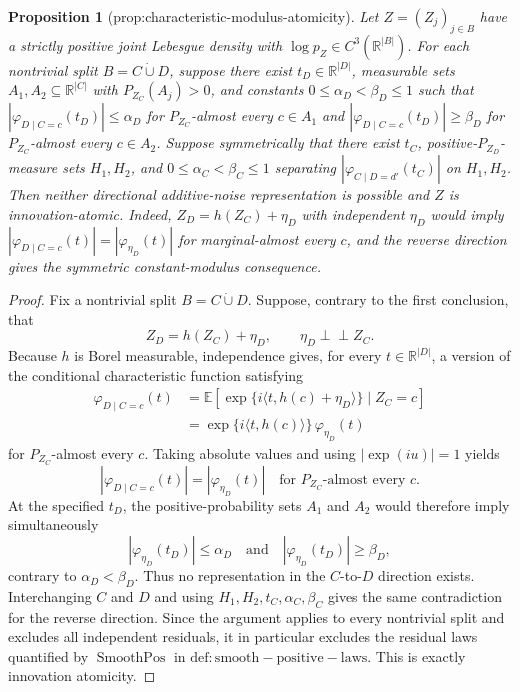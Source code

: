 \documentclass{article}
\newtheorem{proposition}{Proposition}
\begin{document}
\begin{proposition}[prop:characteristic-modulus-atomicity]\label{prop:characteristic-modulus-atomicity}
Let \(Z=(Z_j)_{j\in B}\) have a strictly positive joint Lebesgue density with \(\log p_Z\in C^3(\mathbb R^{|B|})\). For each nontrivial split \(B=C\mathbin{\dot\cup}D\), suppose there exist \(t_D\in\mathbb R^{|D|}\), measurable sets \(A_1,A_2\subseteq\mathbb R^{|C|}\) with \(P_{Z_C}(A_j)>0\), and constants \(0\le\alpha_D<\beta_D\le1\) such that \( |\varphi_{D\mid C=c}(t_D)|\le\alpha_D\) for \(P_{Z_C}\)-almost every \(c\in A_1\) and \( |\varphi_{D\mid C=c}(t_D)|\ge\beta_D\) for \(P_{Z_C}\)-almost every \(c\in A_2\). Suppose symmetrically that there exist \(t_C\), positive-\(P_{Z_D}\)-measure sets \(H_1,H_2\), and \(0\le\alpha_C<\beta_C\le1\) separating \( |\varphi_{C\mid D=d'}(t_C)|\) on \(H_1,H_2\). Then neither directional additive-noise representation is possible and \(Z\) is innovation-atomic. Indeed, \(Z_D=h(Z_C)+\eta_D\) with independent \(\eta_D\) would imply \( |\varphi_{D\mid C=c}(t)|=|\varphi_{\eta_D}(t)|\) for marginal-almost every \(c\), and the reverse direction gives the symmetric constant-modulus consequence.
\end{proposition}
\begin{proof}
Fix a nontrivial split \(B=C\mathbin{\dot\cup}D\).  Suppose, contrary to the first conclusion, that
\[
 Z_D=h(Z_C)+\eta_D,
 \qquad \eta_D\perp\!\!\!\perp Z_C.
\]
Because \(h\) is Borel measurable, independence gives, for every \(t\in\mathbb R^{|D|}\), a version of the conditional characteristic function satisfying
\[
 \begin{aligned}
 \varphi_{D\mid C=c}(t)
 &=\mathbb E\!\left[\exp\{i\langle t,h(c)+\eta_D\rangle\}\mid Z_C=c\right]\\
 &=\exp\{i\langle t,h(c)\rangle\}\,\varphi_{\eta_D}(t)
 \end{aligned}
\]
for \(P_{Z_C}\)-almost every \(c\).  Taking absolute values and using \(|\exp(iu)|=1\) yields
\[
 |\varphi_{D\mid C=c}(t)|=|\varphi_{\eta_D}(t)|
 \quad\text{for }P_{Z_C}\text{-almost every }c.
\]
At the specified \(t_D\), the positive-probability sets \(A_1\) and \(A_2\) would therefore imply simultaneously
\[
 |\varphi_{\eta_D}(t_D)|\leq\alpha_D
 \quad\text{and}\quad
 |\varphi_{\eta_D}(t_D)|\geq\beta_D,
\]
contrary to \(\alpha_D<\beta_D\).  Thus no representation in the \(C\)-to-\(D\) direction exists.  Interchanging \(C\) and \(D\) and using \(H_1,H_2,t_C,\alpha_C,\beta_C\) gives the same contradiction for the reverse direction.  Since the argument applies to every nontrivial split and excludes all independent residuals, it in particular excludes the residual laws quantified by \(\operatorname{SmoothPos}\) in \(\mathrm{def:smooth-positive-laws}\).  This is exactly innovation atomicity.
\end{proof}
\end{document}
